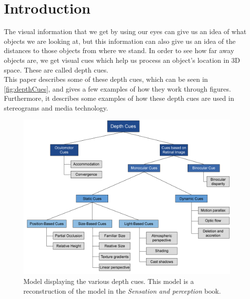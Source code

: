 \section{Introduction}

The visual information that we get by using our eyes can give us an idea of what objects we are looking at, but this information can also give us an idea of the distances to those objects from where we stand. In order to see how far away objects are, we get visual cues which help us process an object's location in 3D space. These are called depth cues\citep[p.~195]{sensationPerception}.\\
This paper describes some of these depth cues, which can be seen in \autoref{fig:depthCues}, and gives a few examples of how they work through figures. Furthermore, it describes some examples of how these depth cues are used in stereograms and media technology.

\begin{figure}[H]
	\centering
	\includegraphics[width=1\linewidth]{figure/Analysis/depthCues.png}
	\caption{Model displaying the various depth cues. This model is a reconstruction of the model in the \textit{Sensation and perception} book\citep[p.~195]{sensationPerception}.}
	\label{fig:depthCues}
\end{figure}